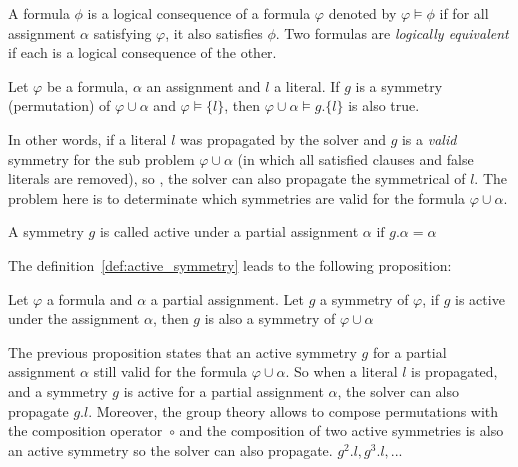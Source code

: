 \begin{definition}
 \label{def:logical_consequence}
 A formula $\phi$ is a logical consequence of a formula $\varphi$ denoted by $\varphi \models \phi$ if for all assignment
 $\alpha$ satisfying $\varphi$, it also satisfies $\phi$. Two formulas are \emph{logically equivalent} if each is a logical
 consequence of the other.
\end{definition}
\begin{proposition}
 \label{prop:symmetry_propagation}
 Let $\varphi$ be a formula, $\alpha$ an assignment and $l$ a literal. 
 If $g$ is a symmetry (permutation) of $\varphi \cup \alpha$ and
 $\varphi \models \{l\}$, then $\varphi \cup \alpha \models g.\{l\}$ is also true.
\end{proposition}
In other words, if a literal $l$ was propagated by the solver and $g$ is a \emph{valid} symmetry for the
sub problem $\varphi \cup \alpha$ (in which all satisfied clauses and false literals are removed), so , the solver can
also propagate the symmetrical of $l$. The problem here is to determinate which symmetries are valid for the formula
$\varphi \cup \alpha$.
\begin{definition}
 \label{def:active_symmetry}
 A symmetry $g$ is called active under a partial assignment $\alpha$ $\text{if } g.\alpha = \alpha$
\end{definition}
The definition~\ref{def:active_symmetry} leads to the following proposition:
\begin{proposition}
 \label{prop:active_symmetry}
 Let $\varphi$ a formula and $\alpha$ a partial assignment. Let $g$ a symmetry of $\varphi$,
 if $g$ is active under the assignment $\alpha$, then $g$ is also a symmetry of $\varphi \cup \alpha$
\end{proposition}
The previous proposition states that an active symmetry $g$ for a partial assignment $\alpha$ still valid for
the formula $\varphi \cup \alpha$. So when a literal $l$ is propagated, and a symmetry $g$ is active for a
partial assignment $\alpha$, the solver can also propagate $g.l$. 
Moreover, the group theory allows to compose permutations with the composition operator~$\circ$ and the composition of two active symmetries is also an active symmetry so the solver can also propagate. $g^2.l, g^3.l, ... $

